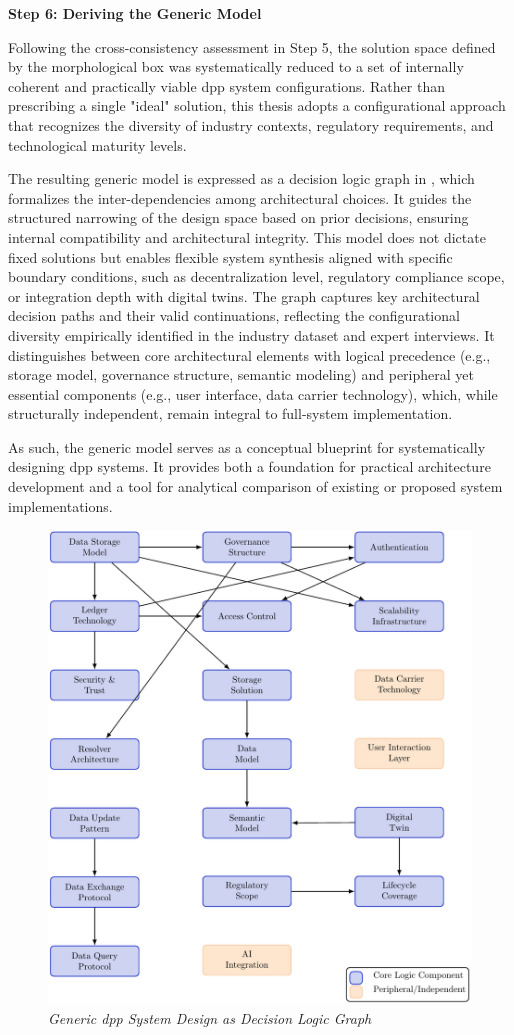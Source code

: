 \textbf{Step 6: Deriving the Generic Model}

Following the cross-consistency assessment in Step 5, the solution space defined by the morphological box was systematically reduced to a set of internally coherent and practically viable \ac{dpp} system configurations. Rather than prescribing a single "ideal" solution, this thesis adopts a configurational approach that recognizes the diversity of industry contexts, regulatory requirements, and technological maturity levels.

The resulting generic model is expressed as a decision logic graph in , which formalizes the inter-dependencies among architectural choices. It guides the structured narrowing of the design space based on prior decisions, ensuring internal compatibility and architectural integrity. This model does not dictate fixed solutions but enables flexible system synthesis aligned with specific boundary conditions, such as decentralization level, regulatory compliance scope, or integration depth with digital twins. The graph captures key architectural decision paths and their valid continuations, reflecting the configurational diversity empirically identified in the industry dataset and expert interviews. It distinguishes between core architectural elements with logical precedence (e.g., storage model, governance structure, semantic modeling) and peripheral yet essential components (e.g., user interface, data carrier technology), which, while structurally independent, remain integral to full-system implementation.

As such, the generic model serves as a conceptual blueprint for systematically designing \ac{dpp} systems. It provides both a foundation for practical architecture development and a tool for analytical comparison of existing or proposed system implementations.

\begin{figure}[!ht]
  \centering
  \includegraphics[width=\textwidth]{figures/dpp_generic_model.pdf}
  \caption{%
    \textit{Generic \ac{dpp} System Design as Decision Logic Graph} 
  }
  \label{fig:dpp_generic_model}
\end{figure}
